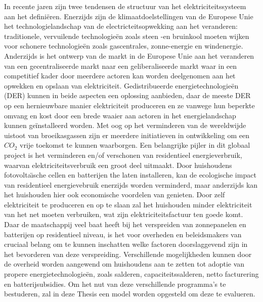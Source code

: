 \documentclass[master=ene,english]{kulemt}
\begin{document}
\begin{abstract*}
 In recente jaren zijn twee tendensen de structuur van het elektriciteitssysteem aan het defini\"{e}ren. Enerzijds zijn de klimaatdoelstellingen van de Europese Unie het technologielandschap van de electricteitsopwekking aan het veranderen: traditionele, vervuilende technologie\"{e}n zoals steen -en bruinkool moeten wijken voor schonere technologie\"{e}n zoals gascentrales, zonne-energie en windenergie. Anderzijds is het ontwerp van de markt in de Europese Unie aan het veranderen van een gecentraliseerde markt naar een geliberaliseerde markt waar in een competitief kader door meerdere actoren kan worden deelgenomen aan het opwekken en opslaan van elektriciteit. Gedistribueerde energietechnologie\"{e}n (DER) kunnen in beide aspecten een oplossing aanbieden, daar de meeste DER op een hernieuwbare manier elektriciteit produceren en ze vanwege hun beperkte omvang en kost door een brede waaier aan actoren in het energielandschap kunnen ge\"{i}nstalleerd worden. 
 \newline
 Met oog op het verminderen van de wereldwijde uistoot van broeikasgassen zijn er meerdere initiatieven in ontwikkeling om een $CO_2$ vrije toekomst te kunnen waarborgen. Een belangrijke pijler in dit globaal project is het verminderen en/of verschonen van residentieel energieverbruik, waarvan elektriciteitsverbruik een groot deel uitmaakt. Door huishoudens fotovolta{\"\i}sche cellen en batterijen the laten installeren, kan de ecologische impact van residentieel energievebruik enerzijds worden verminderd, maar anderzijds kan het huishouden hier ook economische voordelen van genieten. Door zelf elektriciteit te produceren en op te slaan zal het huishouden minder elektriciteit van het net moeten verbruiken, wat zijn elektriciteitsfactuur ten goede komt. 
 \newline \noindent
 Daar de maatschappij veel baat heeft bij het verspreiden van zonnepanelen en batterijen op residentieel niveau, is het voor overheden en beleidsmakers van cruciaal belang om te kunnen inschatten welke factoren doorslaggevend zijn in het bevorderen van deze verspreiding. Verschillende mogelijkheden kunnen door de overheid worden aangewend om huishoudens aan te zetten tot adoptie van propere energietechnologieën, zoals salderen, capaciteitssalderen, netto facturering en batterijsubsidies. Om het nut van deze verschillende programma's te bestuderen, zal in deze Thesis een model worden opgesteld om deze te evalueren.
 \newline \noindent

\end{abstract*}
\end{document}
